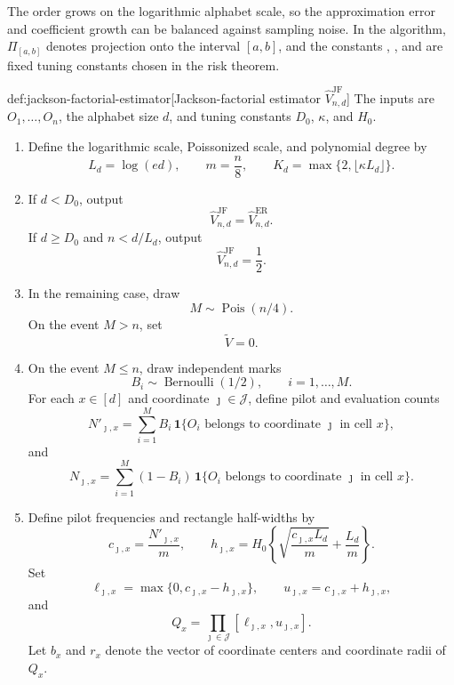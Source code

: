 \documentclass[11pt]{article}
\begin{document}
The order  grows on the logarithmic alphabet scale, so the approximation error and coefficient growth can be balanced against sampling noise. In the algorithm, \(\Pi_{[a,b]}\) denotes projection onto the interval \([a,b]\), and the constants , , and  are fixed tuning constants chosen in the risk theorem.

\begin{algorithmv}{def:jackson-factorial-estimator}[Jackson-factorial estimator \(\widehat V_{n,d}^{\mathrm{JF}}\)]
The inputs are \(O_1,\ldots,O_n\), the alphabet size \(d\), and tuning constants \(D_0\), \(\kappa\), and \(H_0\).

\begin{enumerate}
\item Define the logarithmic scale, Poissonized scale, and polynomial degree by
\[
L_d=\log(ed),
\qquad
m=\frac n8,
\qquad
K_d=\max\{2,\lfloor \kappa L_d\rfloor\}.
\]

\item If \(d<D_0\), output
\[
\widehat V_{n,d}^{\mathrm{JF}}
=
\widehat V_{n,d}^{\mathrm{ER}}.
\]
If \(d\ge D_0\) and \(n<d/L_d\), output
\[
\widehat V_{n,d}^{\mathrm{JF}}
=
\frac12.
\]

\item In the remaining case, draw
\[
M\sim\operatorname{Pois}(n/4).
\]
On the event \(M>n\), set
\[
\widetilde V=0.
\]

\item On the event \(M\le n\), draw independent marks
\[
B_i\sim\operatorname{Bernoulli}(1/2),
\qquad i=1,\ldots,M.
\]
For each \(x\in[d]\) and coordinate \(\jmath\in\mathcal J\), define pilot and evaluation counts
\[
N'_{\jmath,x}
=
\sum_{i=1}^M B_i\,\mathbf 1\{O_i\text{ belongs to coordinate }\jmath\text{ in cell }x\},
\]
and
\[
N_{\jmath,x}
=
\sum_{i=1}^M (1-B_i)\,\mathbf 1\{O_i\text{ belongs to coordinate }\jmath\text{ in cell }x\}.
\]

\item Define pilot frequencies and rectangle half-widths by
\[
c_{\jmath,x}
=
\frac{N'_{\jmath,x}}{m},
\qquad
h_{\jmath,x}
=
H_0
\left\{
\sqrt{\frac{c_{\jmath,x}L_d}{m}}
+
\frac{L_d}{m}
\right\}.
\]
Set
\[
\ell_{\jmath,x}
=
\max\{0,c_{\jmath,x}-h_{\jmath,x}\},
\qquad
u_{\jmath,x}
=
c_{\jmath,x}+h_{\jmath,x},
\]
and
\[
Q_x
=
\prod_{\jmath\in\mathcal J}
[\ell_{\jmath,x},u_{\jmath,x}].
\]
Let \(b_x\) and \(r_x\) denote the vector of coordinate centers and coordinate radii of \(Q_x\).


\end{enumerate}
\end{algorithmv}
\end{document}

